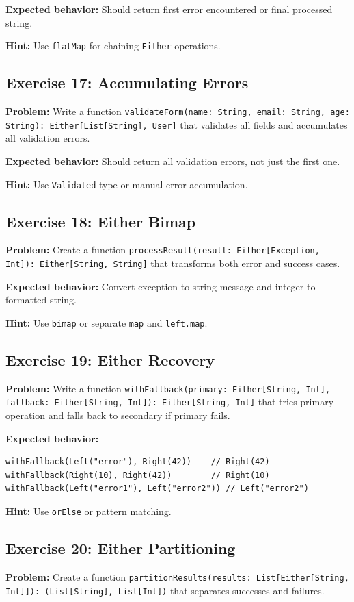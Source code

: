 \documentclass[12pt,a4paper]{article}
\begin{document}
\textbf{Expected behavior:} Should return first error encountered or final processed string.

\textbf{Hint:} Use \texttt{flatMap} for chaining \texttt{Either} operations.

\subsection{Exercise 17: Accumulating Errors}
\textbf{Problem:} Write a function \texttt{validateForm(name: String, email: String, age: String): Either[List[String], User]} that validates all fields and accumulates all validation errors.

\textbf{Expected behavior:} Should return all validation errors, not just the first one.

\textbf{Hint:} Use \texttt{Validated} type or manual error accumulation.

\subsection{Exercise 18: Either Bimap}
\textbf{Problem:} Create a function \texttt{processResult(result: Either[Exception, Int]): Either[String, String]} that transforms both error and success cases.

\textbf{Expected behavior:} Convert exception to string message and integer to formatted string.

\textbf{Hint:} Use \texttt{bimap} or separate \texttt{map} and \texttt{left.map}.

\subsection{Exercise 19: Either Recovery}
\textbf{Problem:} Write a function \texttt{withFallback(primary: Either[String, Int], fallback: Either[String, Int]): Either[String, Int]} that tries primary operation and falls back to secondary if primary fails.

\textbf{Expected behavior:}
\begin{lstlisting}
withFallback(Left("error"), Right(42))    // Right(42)
withFallback(Right(10), Right(42))        // Right(10)
withFallback(Left("error1"), Left("error2")) // Left("error2")
\end{lstlisting}

\textbf{Hint:} Use \texttt{orElse} or pattern matching.

\subsection{Exercise 20: Either Partitioning}
\textbf{Problem:} Create a function \texttt{partitionResults(results: List[Either[String, Int]]): (List[String], List[Int])} that separates successes and failures.
\end{document}
